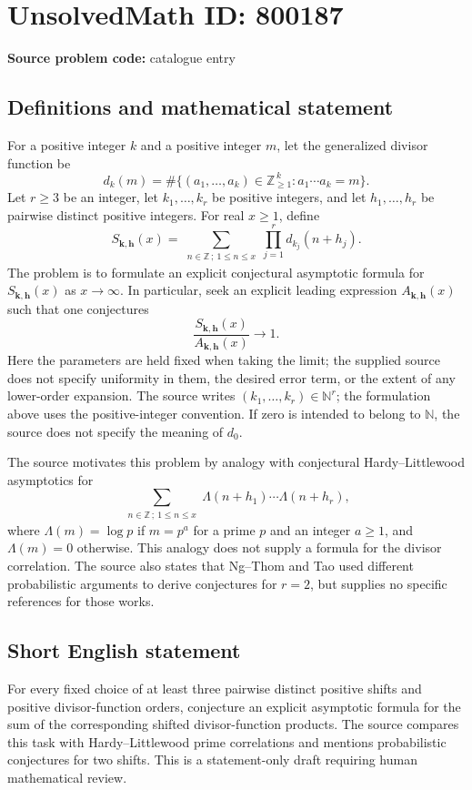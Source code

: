 \documentclass[11pt]{article}
\newcommand{\N}{\mathbb{N}}
\newcommand{\Z}{\mathbb{Z}}
\begin{document}
\section*{UnsolvedMath ID: 800187}
\textbf{Source problem code:} catalogue entry
\subsection{Definitions and mathematical statement}
For a positive integer \(k\) and a positive integer \(m\), let the generalized divisor function be
\[
d_k(m)=\#\{(a_1,\ldots,a_k)\in\Z_{\ge1}^{\,k}:a_1\cdots a_k=m\}.
\]
Let \(r\ge3\) be an integer, let \(k_1,\ldots,k_r\) be positive integers, and let \(h_1,\ldots,h_r\) be pairwise distinct positive integers. For real \(x\ge1\), define
\[
S_{\mathbf{k},\mathbf{h}}(x)=\sum_{\substack{n\in\Z\,;\ 1\le n\le x}}\prod_{j=1}^{r}d_{k_j}(n+h_j).
\]
The problem is to formulate an explicit conjectural asymptotic formula for \(S_{\mathbf{k},\mathbf{h}}(x)\) as \(x\to\infty\). In particular, seek an explicit leading expression \(A_{\mathbf{k},\mathbf{h}}(x)\) such that one conjectures
\[
\frac{S_{\mathbf{k},\mathbf{h}}(x)}{A_{\mathbf{k},\mathbf{h}}(x)}\longrightarrow1.
\]
Here the parameters are held fixed when taking the limit; the supplied source does not specify uniformity in them, the desired error term, or the extent of any lower-order expansion. The source writes \((k_1,\ldots,k_r)\in\N^r\); the formulation above uses the positive-integer convention. If zero is intended to belong to \(\N\), the source does not specify the meaning of \(d_0\).

The source motivates this problem by analogy with conjectural Hardy--Littlewood asymptotics for
\[
\sum_{\substack{n\in\Z\,;\ 1\le n\le x}}\Lambda(n+h_1)\cdots\Lambda(n+h_r),
\]
where \(\Lambda(m)=\log p\) if \(m=p^a\) for a prime \(p\) and an integer \(a\ge1\), and \(\Lambda(m)=0\) otherwise. This analogy does not supply a formula for the divisor correlation. The source also states that Ng--Thom and Tao used different probabilistic arguments to derive conjectures for \(r=2\), but supplies no specific references for those works.
\subsection{Short English statement}
For every fixed choice of at least three pairwise distinct positive shifts and positive divisor-function orders, conjecture an explicit asymptotic formula for the sum of the corresponding shifted divisor-function products. The source compares this task with Hardy--Littlewood prime correlations and mentions probabilistic conjectures for two shifts. This is a statement-only draft requiring human mathematical review.
\end{document}
